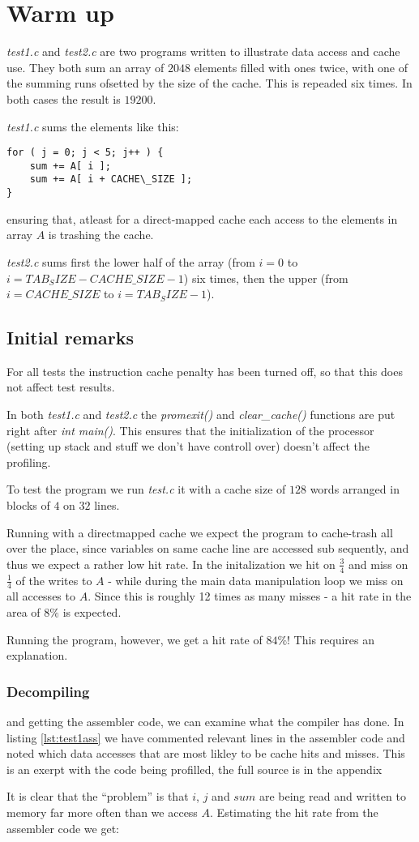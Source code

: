 \section{Warm up}
\emph{test1.c} and \emph{test2.c} are two programs written to illustrate data
access and cache use. They both sum an array of $2048$ elements filled with ones
twice, with one of the summing runs ofsetted by the size of the cache. This is repeaded six
times. In both cases the result is $19200$.

\emph{test1.c} sums the elements like this:
\begin{lstlisting}
for ( j = 0; j < 5; j++ ) {
	sum += A[ i ];
	sum += A[ i + CACHE\_SIZE ];
}
\end{lstlisting}
ensuring that, atleast for a direct-mapped cache each access to the elements in
array $A$ is trashing the cache.

\emph{test2.c} sums first the lower half of the array (from $i=0$ to
$i=TAB_SIZE-CACHE\_SIZE-1$) six times, then the upper (from $i=CACHE\_SIZE$ to
$i=TAB_SIZE-1$).

\subsection{Initial remarks}
For all tests the instruction cache penalty has been turned off, so that this
does not affect test results.

In both \emph{test1.c} and \emph{test2.c} the \emph{promexit()} and
\emph{clear\_cache()} functions are put right after \emph{int main()}. This
ensures that the initialization of the processor (setting up stack and stuff we
don't have controll over) doesn't affect the profiling.

To test the program we run \emph{test.c} it with a cache size of $128$ words
arranged in blocks of $4$ on $32$ lines.

Running with a directmapped cache we expect the program to cache-trash all over
the place, since variables on same cache line are accessed sub sequently, and
thus we expect a rather low hit rate.
In the initalization we hit on $\frac{3}{4}$ and miss on $\frac{1}{4}$ of the writes to $A$ - while during
the main data manipulation loop we miss on all accesses to $A$. Since this is
roughly 12 times as many misses - a hit rate in the area of $8\%$ is expected. 

Running the program, however, we get a hit rate of $84\%$! This requires an
explanation.
\subsubsection{Decompiling} and getting the assembler code, we can examine what
the compiler has done. In listing \ref{lst:test1ass} we have commented relevant
lines in the assembler code and noted which data accesses that are most likley
to be cache hits and misses. This is an exerpt with the code being profilled,
the full source is in the appendix

It is clear that the ``problem'' is that $i$,
$j$ and $sum$ are being read and written to memory far more often than we access $A$.
Estimating the hit rate from the assembler code we get:

